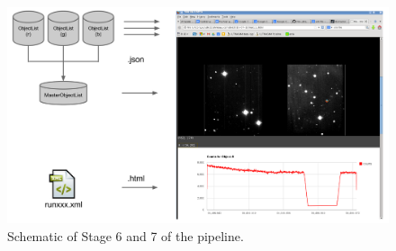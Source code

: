 \begin{figure}
	\centering
	\includegraphics[width=130mm]{images/webpublish.png}
	\caption{Schematic of Stage 6 and 7 of the pipeline.}
	\label{webpublish}
\end{figure}

